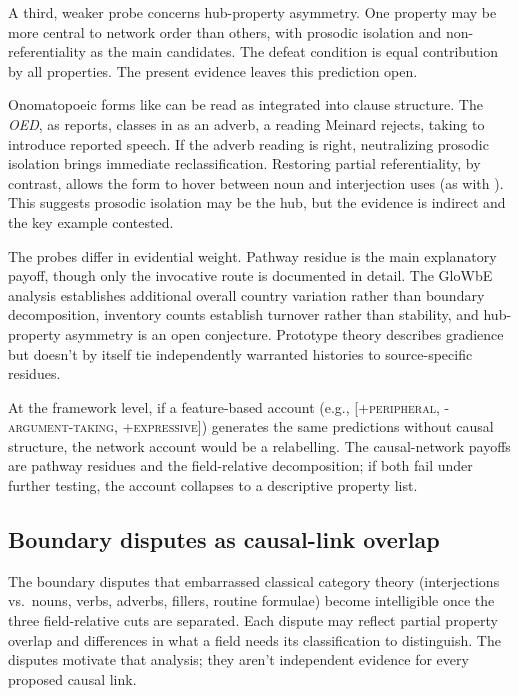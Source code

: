 \documentclass[12pt]{article}
\begin{document}
A third, weaker probe concerns hub-property asymmetry. One property may
be more central to network order than others, with prosodic isolation
and non-referentiality as the main candidates. The defeat condition is
equal contribution by all properties. The present evidence leaves this
prediction open.

Onomatopoeic forms like  can be read as integrated into
clause structure. The \textit{OED}, as \textcite[151--152]{meinard2015}
reports, classes  in  as an adverb,
a reading Meinard rejects, taking  to introduce reported
speech. If the adverb reading is right, neutralizing prosodic isolation
brings immediate reclassification. Restoring partial referentiality, by
contrast, allows the form to hover between noun and interjection uses (as
with ). This suggests prosodic isolation may be the hub, but
the evidence is indirect and the key example contested.

The probes differ in evidential weight. Pathway residue is the main
explanatory payoff, though only the invocative route is documented in detail.
The GloWbE analysis establishes additional overall country variation rather
than boundary decomposition, inventory counts establish turnover rather than
stability, and hub-property asymmetry is an open conjecture. Prototype theory
describes gradience but doesn't by itself tie independently warranted
histories to source-specific residues.

At the framework level, if a feature-based account
(e.g., [\textsc{+peripheral}, \textsc{-argument-taking},
\textsc{+expressive}]) generates the same predictions without causal
structure, the network account would be a relabelling. The
causal-network payoffs are pathway residues and the field-relative
decomposition; if both fail under further testing, the account collapses to a descriptive
property list.

\subsection{Boundary disputes as causal-link overlap}\label{sec:boundaries}

The boundary disputes that embarrassed classical category theory
(interjections vs.\ nouns, verbs, adverbs, fillers, routine formulae)
become intelligible once the three field-relative cuts are separated. Each
dispute may reflect partial property overlap and differences in what a field
needs its classification to distinguish. The disputes motivate that analysis;
they aren't independent evidence for every proposed causal link.
\end{document}
